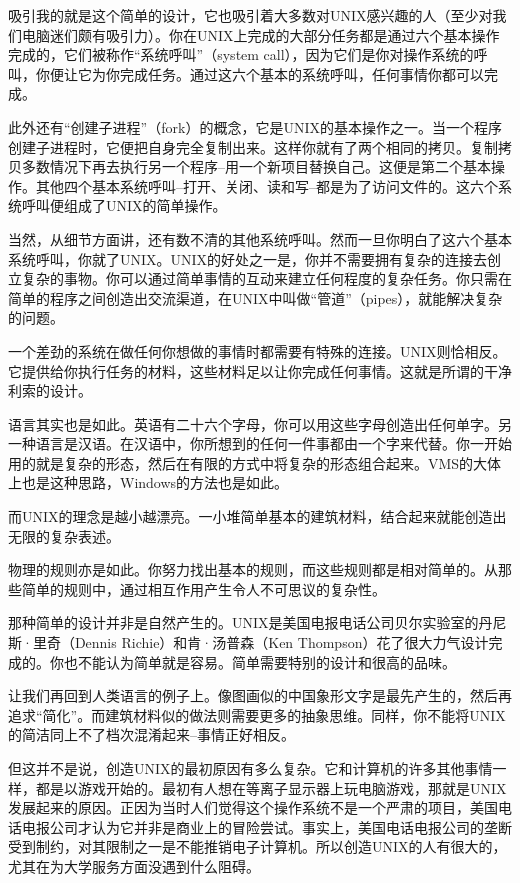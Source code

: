 吸引我的就是这个简单的设计，它也吸引着大多数对UNIX感兴趣的人（至少对我们电脑迷们颇有吸引力）。你在UNIX上完成的大部分任务都是通过六个基本操作完成的，它们被称作“系统呼叫”（system call），因为它们是你对操作系统的呼叫，你便让它为你完成任务。通过这六个基本的系统呼叫，任何事情你都可以完成。

此外还有“创建子进程”（fork）的概念，它是UNIX的基本操作之一。当一个程序创建子进程时，它便把自身完全复制出来。这样你就有了两个相同的拷贝。复制拷贝多数情况下再去执行另一个程序--用一个新项目替换自己。这便是第二个基本操作。其他四个基本系统呼叫--打开、关闭、读和写--都是为了访问文件的。这六个系统呼叫便组成了UNIX的简单操作。

当然，从细节方面讲，还有数不清的其他系统呼叫。然而一旦你明白了这六个基本系统呼叫，你就了UNIX。UNIX的好处之一是，你并不需要拥有复杂的连接去创立复杂的事物。你可以通过简单事情的互动来建立任何程度的复杂任务。你只需在简单的程序之间创造出交流渠道，在UNIX中叫做“管道”（pipes），就能解决复杂的问题。

一个差劲的系统在做任何你想做的事情时都需要有特殊的连接。UNIX则恰相反。它提供给你执行任务的材料，这些材料足以让你完成任何事情。这就是所谓的干净利索的设计。

语言其实也是如此。英语有二十六个字母，你可以用这些字母创造出任何单字。另一种语言是汉语。在汉语中，你所想到的任何一件事都由一个字来代替。你一开始用的就是复杂的形态，然后在有限的方式中将复杂的形态组合起来。VMS的大体上也是这种思路，Windows的方法也是如此。

而UNIX的理念是越小越漂亮。一小堆简单基本的建筑材料，结合起来就能创造出无限的复杂表述。

物理的规则亦是如此。你努力找出基本的规则，而这些规则都是相对简单的。从那些简单的规则中，通过相互作用产生令人不可思议的复杂性。

那种简单的设计并非是自然产生的。UNIX是美国电报电话公司贝尔实验室的丹尼斯·里奇（Dennis Richie）和肯·汤普森（Ken Thompson）花了很大力气设计完成的。你也不能认为简单就是容易。简单需要特别的设计和很高的品味。

让我们再回到人类语言的例子上。像图画似的中国象形文字是最先产生的，然后再追求“简化”。而建筑材料似的做法则需要更多的抽象思维。同样，你不能将UNIX的简洁同上不了档次混淆起来--事情正好相反。

但这并不是说，创造UNIX的最初原因有多么复杂。它和计算机的许多其他事情一样，都是以游戏开始的。最初有人想在等离子显示器上玩电脑游戏，那就是UNIX发展起来的原因。正因为当时人们觉得这个操作系统不是一个严肃的项目，美国电话电报公司才认为它并非是商业上的冒险尝试。事实上，美国电话电报公司的垄断受到制约，对其限制之一是不能推销电子计算机。所以创造UNIX的人有很大的，尤其在为大学服务方面没遇到什么阻碍。

